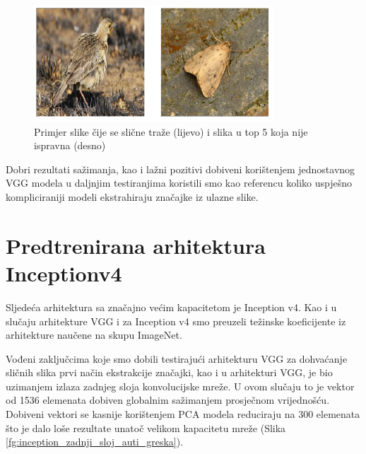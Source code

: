 \documentclass[times, utf8, proizvoljni, numeric]{fer}
\begin{document}
\begin{figure}[H]
\begin{center}
	\captionsetup{justification=centering}
	\includegraphics[width=0.8\textwidth]{./imgs/greske_vgg.png}
	\caption{Primjer slike čije se slične traže (lijevo) i slika u top 5 koja nije ispravna (desno)}
	\label{fg:greske_vgg}
\end{center}
\end{figure}

Dobri rezultati sažimanja, kao i lažni pozitivi dobiveni korištenjem jednostavnog VGG modela u daljnjim testiranjima koristili smo kao referencu koliko uspješno kompliciraniji modeli ekstrahiraju značajke iz ulazne slike.

\section{Predtrenirana arhitektura Inceptionv4}

Sljedeća arhitektura sa značajno većim kapacitetom je Inception v4. Kao i u slučaju arhitekture VGG i za Inception v4 smo preuzeli težinske koeficijente iz arhitekture naučene na skupu ImageNet.

Vođeni zaključcima koje smo dobili testirajući arhitekturu VGG za dohvaćanje sličnih slika prvi način ekstrakcije značajki, kao i u arhitekturi VGG, je bio uzimanjem izlaza zadnjeg sloja konvolucijske mreže. U ovom slučaju to je vektor od 1536 elemenata dobiven globalnim sažimanjem prosječnom vrijednošću. Dobiveni vektori se kasnije korištenjem PCA modela reduciraju na 300 elemenata što je dalo loše rezultate unatoč velikom kapacitetu mreže (Slika \ref{fg:inception_zadnji_sloj_auti_greska}).
\end{document}
